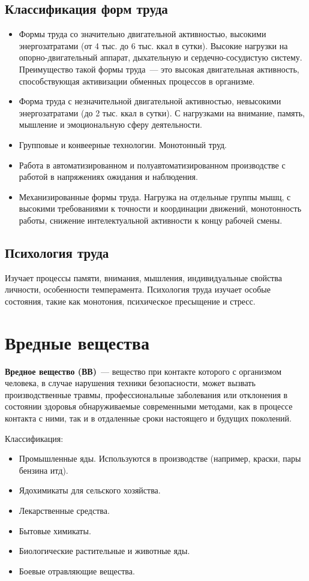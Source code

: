 \subsection{Классификация форм труда}
\begin{itemize}
	\item Формы труда со значительно двигательной активностью, высокими энергозатратами (от 4 тыс. до 6 тыс. ккал в сутки). Высокие нагрузки на опорно-двигательный аппарат, дыхательную и сердечно-сосудистую систему. Преимущество такой формы труда~--- это высокая двигательная активность, способствующая активизации обменных процессов в организме.
	\item Форма труда с незначительной двигательной активностью, невысокими энергозатратами (до 2 тыс. ккал в сутки). С нагрузками на внимание, память, мышление и эмоциональную сферу деятельности.
	\item Групповые и конвеерные технологии. Монотонный труд.
	\item Работа в автоматизированном и полуавтоматизированном производстве с работой в напряжениях ожидания и наблюдения.
	\item Механизированные формы труда. Нагрузка на отдельные группы мышц, с высокими требованиями к точности и координации движений, монотонность работы, снижение интелектуальной активности к концу рабочей смены.
\end{itemize}

\subsection{Психология труда}
Изучает процессы памяти, внимания, мышления, индивидуальные свойства личности, особенности темперамента. Психология труда изучает особые состояния, такие как монотония, психическое пресыщение и стресс.

\section{Вредные вещества}
\textbf{Вредное вещество (ВВ)}~--- вещество при контакте которого с организмом человека, в случае нарушения техники безопасности, может вызвать производственные травмы, профессиональные заболевания или отклонения в состоянии здоровья обнаруживаемые современными методами, как в процессе контакта с ними, так и в отдаленные сроки настоящего и будущих поколений.

Классификация:
\begin{itemize}
	\item Промышленные яды. Используются в производстве (например, краски, пары бензина итд).
	\item Ядохимикаты для сельского хозяйства.
	\item Лекарственные средства.
	\item Бытовые химикаты.
	\item Биологические растительные и животные яды.
	\item Боевые отравляющие вещества.
\end{itemize}


